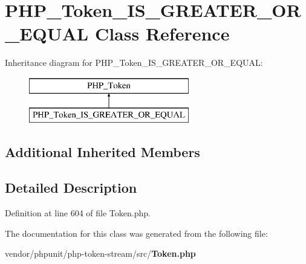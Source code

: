 \section{P\+H\+P\+\_\+\+Token\+\_\+\+I\+S\+\_\+\+G\+R\+E\+A\+T\+E\+R\+\_\+\+O\+R\+\_\+\+E\+Q\+U\+A\+L Class Reference}
\label{class_p_h_p___token___i_s___g_r_e_a_t_e_r___o_r___e_q_u_a_l}
Inheritance diagram for P\+H\+P\+\_\+\+Token\+\_\+\+I\+S\+\_\+\+G\+R\+E\+A\+T\+E\+R\+\_\+\+O\+R\+\_\+\+E\+Q\+U\+A\+L\+:\begin{figure}[H]
\begin{center}
\leavevmode
\includegraphics[height=2.000000cm]{class_p_h_p___token___i_s___g_r_e_a_t_e_r___o_r___e_q_u_a_l}
\end{center}
\end{figure}
\subsection*{Additional Inherited Members}


\subsection{Detailed Description}


Definition at line 604 of file Token.\+php.



The documentation for this class was generated from the following file\+:\begin{DoxyCompactItemize}
\item 
vendor/phpunit/php-\/token-\/stream/src/{\bf Token.\+php}\end{DoxyCompactItemize}
